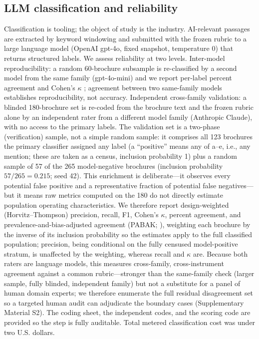 \documentclass[utf8]{FrontiersinHarvard} %
\begin{document}
\subsection{LLM classification and reliability}
Classification is tooling; the object of study is the industry. AI-relevant passages are extracted by keyword windowing and submitted with the frozen rubric to a large language model (OpenAI gpt-4o, fixed snapshot, temperature 0) that returns structured labels. We assess reliability at two levels. Inter-model reproducibility: a random 60-brochure subsample is re-classified by a second model from the same family (gpt-4o-mini) and we report per-label percent agreement and Cohen's $\kappa$ \citep{cohen1960}; agreement between two same-family models establishes reproducibility, not accuracy. Independent cross-family validation: a blinded 180-brochure set is re-coded from the brochure text and the frozen rubric alone by an independent rater from a different model family (Anthropic Claude), with no access to the primary labels. The validation set is a two-phase (verification) sample, not a simple random sample: it comprises all 123 brochures the primary classifier assigned any label (a ``positive'' means any of a--e, i.e., any mention; these are taken as a census, inclusion probability 1) plus a random sample of 57 of the 265 model-negative brochures (inclusion probability $57/265 = 0.215$; seed 42). This enrichment is deliberate---it observes every potential false positive and a representative fraction of potential false negatives---but it means raw metrics computed on the 180 do not directly estimate population operating characteristics. We therefore report design-weighted (Horvitz--Thompson) precision, recall, F1, Cohen's $\kappa$, percent agreement, and prevalence-and-bias-adjusted agreement (PABAK; \citealp{byrt1993}), weighting each brochure by the inverse of its inclusion probability so the estimates apply to the full classified population; precision, being conditional on the fully censused model-positive stratum, is unaffected by the weighting, whereas recall and $\kappa$ are. Because both raters are language models, this measures cross-family, cross-instrument agreement against a common rubric---stronger than the same-family check (larger sample, fully blinded, independent family) but not a substitute for a panel of human domain experts; we therefore enumerate the full residual disagreement set so a targeted human audit can adjudicate the boundary cases (Supplementary Material S2). The coding sheet, the independent codes, and the scoring code are provided so the step is fully auditable. Total metered classification cost was under two U.S. dollars.
\end{document}
